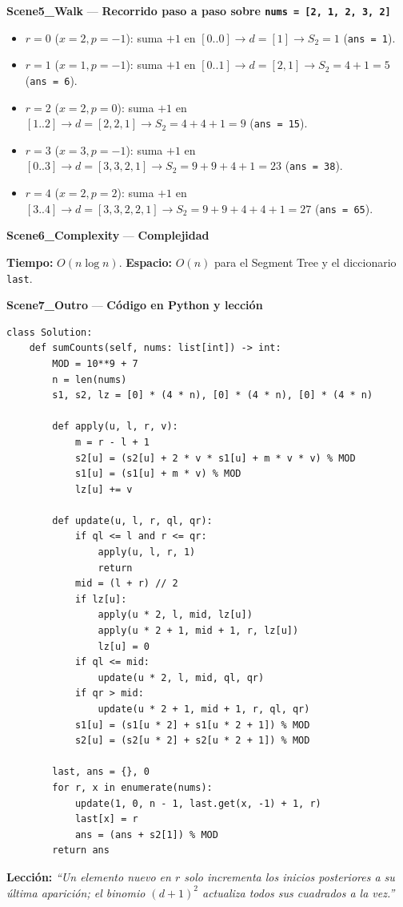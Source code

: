 \documentclass[letterpaper,10pt]{article}
\newcommand{\scene}[2]{\noindent\textbf{\textcolor{mcaqua}{#1}} --- \textbf{#2}\par\vspace{1pt}}
\begin{document}
\begin{shaded}
\scene{Scene5\_Walk}{Recorrido paso a paso sobre \texttt{nums = [2, 1, 2, 3, 2]}}
\begin{itemize}\setlength{\itemsep}{1pt}
  \item $r=0$ ($x=2, p=-1$): suma $+1$ en $[0..0] \to d=[1] \to S_2 = 1$ (\texttt{ans = 1}).
  \item $r=1$ ($x=1, p=-1$): suma $+1$ en $[0..1] \to d=[2, 1] \to S_2 = 4+1 = 5$ (\texttt{ans = 6}).
  \item $r=2$ ($x=2, p=0$): suma $+1$ en $[1..2] \to d=[2, 2, 1] \to S_2 = 4+4+1 = 9$ (\texttt{ans = 15}).
  \item $r=3$ ($x=3, p=-1$): suma $+1$ en $[0..3] \to d=[3, 3, 2, 1] \to S_2 = 9+9+4+1 = 23$ (\texttt{ans = 38}).
  \item $r=4$ ($x=2, p=2$): suma $+1$ en $[3..4] \to d=[3, 3, 2, 2, 1] \to S_2 = 9+9+4+4+1 = 27$ (\texttt{ans = 65}).
\end{itemize}

\scene{Scene6\_Complexity}{Complejidad}
\textbf{Tiempo:} $O(n \log n)$. \quad \textbf{Espacio:} $O(n)$ para el Segment Tree y el diccionario \texttt{last}.
\end{shaded}

\scene{Scene7\_Outro}{C\'odigo en Python y lecci\'on}
\begin{Verbatim}[frame=single,fontsize=\small]
class Solution:
    def sumCounts(self, nums: list[int]) -> int:
        MOD = 10**9 + 7
        n = len(nums)
        s1, s2, lz = [0] * (4 * n), [0] * (4 * n), [0] * (4 * n)

        def apply(u, l, r, v):
            m = r - l + 1
            s2[u] = (s2[u] + 2 * v * s1[u] + m * v * v) % MOD
            s1[u] = (s1[u] + m * v) % MOD
            lz[u] += v

        def update(u, l, r, ql, qr):
            if ql <= l and r <= qr:
                apply(u, l, r, 1)
                return
            mid = (l + r) // 2
            if lz[u]:
                apply(u * 2, l, mid, lz[u])
                apply(u * 2 + 1, mid + 1, r, lz[u])
                lz[u] = 0
            if ql <= mid:
                update(u * 2, l, mid, ql, qr)
            if qr > mid:
                update(u * 2 + 1, mid + 1, r, ql, qr)
            s1[u] = (s1[u * 2] + s1[u * 2 + 1]) % MOD
            s2[u] = (s2[u * 2] + s2[u * 2 + 1]) % MOD

        last, ans = {}, 0
        for r, x in enumerate(nums):
            update(1, 0, n - 1, last.get(x, -1) + 1, r)
            last[x] = r
            ans = (ans + s2[1]) % MOD
        return ans
\end{Verbatim}
\textbf{Lecci\'on:} \textit{``Un elemento nuevo en $r$ solo incrementa los inicios posteriores a su \'ultima aparici\'on; el binomio $(d+1)^2$ actualiza todos sus cuadrados a la vez.''}
\end{document}
